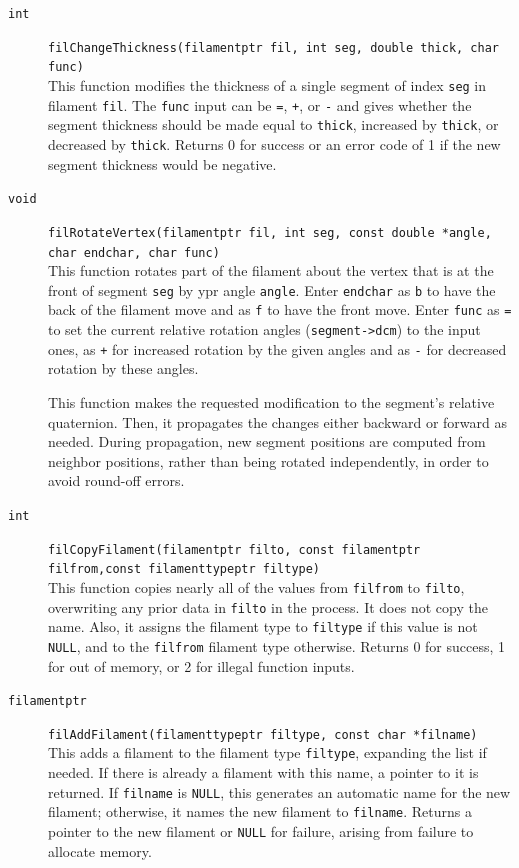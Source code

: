 \documentclass {scrbook}
\newcommand {\ttt} {\texttt}
\begin{document}
\begin{description}
\item[\ttt{int}]
\ttt{filChangeThickness(filamentptr fil, int seg, double thick, char func)}
\hfill \\
This function modifies the thickness of a single segment of index \ttt{seg} in filament \ttt{fil}. The \ttt{func} input can be \ttt{=}, \ttt{+}, or \ttt{-} and gives whether the segment thickness should be made equal to \ttt{thick}, increased by \ttt{thick}, or decreased by \ttt{thick}. Returns 0 for success or an error code of 1 if the new segment thickness would be negative.

\item[\ttt{void}]
\ttt{filRotateVertex(filamentptr fil, int seg, const double *angle, char endchar, char func)}
\hfill \\
This function rotates part of the filament about the vertex that is at the front of segment \ttt{seg} by ypr angle \ttt{angle}. Enter \ttt{endchar} as \ttt{b} to have the back of the filament move and as \ttt{f} to have the front move. Enter \ttt{func} as \ttt{=} to set the current relative rotation angles (\ttt{segment->dcm}) to the input ones, as \ttt{+} for increased rotation by the given angles and as \ttt{-} for decreased rotation by these angles.

This function makes the requested modification to the segment's relative quaternion. Then, it propagates the changes either backward or forward as needed. During propagation, new segment positions are computed from neighbor positions, rather than being rotated independently, in order to avoid round-off errors.

\item[\ttt{int}]
\ttt{filCopyFilament(filamentptr filto, const filamentptr filfrom,const filamenttypeptr filtype)}
\hfill \\
This function copies nearly all of the values from \ttt{filfrom} to \ttt{filto}, overwriting any prior data in \ttt{filto} in the process. It does not copy the name. Also, it assigns the filament type to \ttt{filtype} if this value is not \ttt{NULL}, and to the \ttt{filfrom} filament type otherwise. Returns 0 for success, 1 for out of memory, or 2 for illegal function inputs.

\item[\ttt{filamentptr}]
\ttt{filAddFilament(filamenttypeptr filtype, const char *filname)}
\hfill \\
This adds a filament to the filament type \ttt{filtype}, expanding the list if needed. If there is already a filament with this name, a pointer to it is returned. If \ttt{filname} is \ttt{NULL}, this generates an automatic name for the new filament; otherwise, it names the new filament to \ttt{filname}. Returns a pointer to the new filament or \ttt{NULL} for failure, arising from failure to allocate memory.



\end{description}
\end{document}
